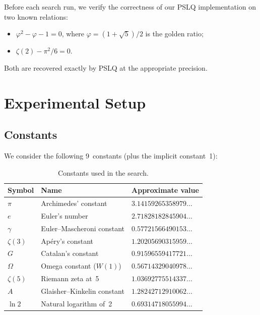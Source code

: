 \documentclass[11pt]{amsart}
\theoremstyle{remark}
\begin{document}
Before each search run, we verify the correctness of our PSLQ implementation on two
known relations:
\begin{itemize}
\item $\varphi^2-\varphi-1=0$, where $\varphi=(1+\sqrt{5})/2$ is the golden ratio;
\item $\zeta(2)-\pi^2/6=0$.
\end{itemize}
Both are recovered exactly by PSLQ at the appropriate precision.

\section{Experimental Setup}\label{sec:setup}

\subsection{Constants}\label{ssec:constants}

We consider the following 9~constants (plus the implicit constant~1):

\begin{table}[ht]
\centering
\caption{Constants used in the search.}\label{tab:constants}
\begin{tabular}{@{}lll@{}}
\toprule
Symbol & Name & Approximate value \\
\midrule
$\pi$       & Archimedes' constant          & $3.14159265358979\ldots$ \\
$e$         & Euler's number                & $2.71828182845904\ldots$ \\
$\gamma$    & Euler--Mascheroni constant     & $0.57721566490153\ldots$ \\
$\zeta(3)$  & Ap\'ery's constant            & $1.20205690315959\ldots$ \\
$G$         & Catalan's constant            & $0.91596559417721\ldots$ \\
$\Omega$    & Omega constant ($W(1)$)       & $0.56714329040978\ldots$ \\
$\zeta(5)$  & Riemann zeta at~5             & $1.03692775514337\ldots$ \\
$A$         & Glaisher--Kinkelin constant   & $1.28242712910062\ldots$ \\
$\ln 2$     & Natural logarithm of~2        & $0.69314718055994\ldots$ \\
\bottomrule
\end{tabular}
\end{table}
\end{document}

